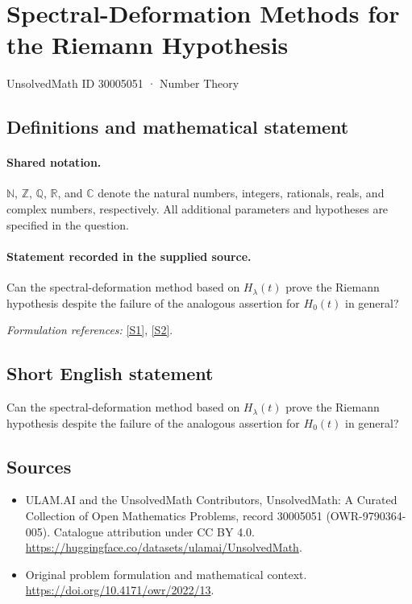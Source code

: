 \documentclass[11pt]{article}
\newcommand{\sref}[2]{\hyperlink{source:#1:#2}{[S#2]}}
\begin{document}
\setcounter{section}{30005050}
\section{Spectral-Deformation Methods for the Riemann Hypothesis}\label{30005051}
{\small UnsolvedMath ID 30005051 · Number Theory}
\subsection{Definitions and mathematical statement}

\paragraph{Shared notation.}$\mathbb N$, $\mathbb Z$, $\mathbb Q$, $\mathbb R$, and $\mathbb C$ denote the natural numbers, integers, rationals, reals, and complex numbers, respectively. All additional parameters and hypotheses are specified in the question.


\paragraph{Statement recorded in the supplied source.}
Can the spectral-deformation method based on $H_\lambda(t)$ prove the Riemann hypothesis despite the failure of the analogous assertion for $H_0(t)$ in general?
\par\smallskip\textit{Formulation references:} \sref{30005051}{1}, \sref{30005051}{2}.
\subsection{Short English statement}
Can the spectral-deformation method based on $H_\lambda(t)$ prove the Riemann hypothesis despite the failure of the analogous assertion for $H_0(t)$ in general?
\subsection{Sources}
\begin{itemize}
\item[\hypertarget{source:30005051:1}{S1}] ULAM.AI and the UnsolvedMath Contributors, UnsolvedMath: A Curated Collection of Open Mathematics Problems, record 30005051 (OWR-9790364-005). Catalogue attribution under CC BY 4.0.
\url{https://huggingface.co/datasets/ulamai/UnsolvedMath}.
\item[\hypertarget{source:30005051:2}{S2}] Original problem formulation and mathematical context.
\url{https://doi.org/10.4171/owr/2022/13}.
\end{itemize}
\label{end:30005051}
\end{document}
